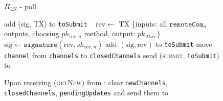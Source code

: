 \begin{figure}[H]
\begin{protocolbox}{$\Pi_{\mathrm{LN}}$ - poll}
\begin{algorithmic}[1]
                  \State add (sig, TX) to \texttt{toSubmit}
                \EndIf
              \EndFor
            \Else \ 
              \State $\mathrm{rev} \gets$ TX \{inputs: all
              $\mathtt{remoteCom}_n$ outputs, choosing $ph_{\mathrm{rev}, n}$
              method, output: $pk_{\mathit{Alice}}$\}
              \State $\mathrm{sig} \gets \mathtt{signature}\left(\mathrm{rev},
              sh_{\mathrm{rev}, n}\right)$
              \State add $\left(\mathrm{sig}, \mathrm{rev}\right)$ to
              \texttt{toSubmit}
            \EndIf
            \State move \texttt{channel} from \texttt{channels} to
            \texttt{closedChannels}
          \EndFor
          \State send (\textsc{submit}, \texttt{toSubmit}) to \ledger
        \EndIndent
        \Statex

        \State Upon receiving (\textsc{getNew}) from \alice:
        \Indent
          \State clear \texttt{newChannels}, \texttt{closedChannels},
          \texttt{pendingUpdates} and send them to \alice
        \EndIndent
      \end{algorithmic}
    \end{protocolbox}
    \caption{}
    \label{alg:protocol:poll}
  \end{figure}

